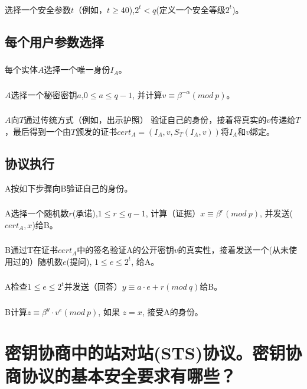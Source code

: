 \documentclass[11pt,a4paper]{article}
\begin{document}
\subsubsection{}选择一个安全参数$t$（例如，$t \ge40$),$2^t < q$(定义一个安全等级$2^t$)。

\subsection{每个用户参数选择}
\subsubsection{}每个实体$A$选择一个唯一身份$I_A$。
\subsubsection{}$A$选择一个秘密密钥$a$,$0 \le a \le q-1$, 并计算$v \equiv \beta^{-\alpha} (mod\ p)$。
\subsubsection{}$A$向$T$通过传统方式（例如，出示护照） 验证自己的身份，接着将真实的$v$传递给$T$，最后得到一个由$T$颁发的证书$cert_A=(I_A,v,S_T(I_A,v))$将$I_A$和$v$绑定。

\subsection{协议执行} A按如下步骤向B验证自己的身份。
\subsubsection{}A选择一个随机数$r$(承诺),$1\le r \le q-1$, 计算（证据）$x\equiv \beta^r(mod\ p)$, 并发送($cert_A, x$)给B。
\subsubsection{}B通过T在证书$cert_A$中的签名验证A的公开密钥$v$的真实性，接着发送一个(从未使用过的）随机数$e$(提问), $1 \le e \le 2^t$, 给A。
\subsubsection{}A检查$1\le e \le2^t$并发送（回答）$y\equiv a·e+r(mod\ q)$给B。
\subsubsection{}B计算$z\equiv \beta^y·v^e(mod\ p)$, 如果 $z=x$, 接受A的身份。
\section{密钥协商中的站对站(STS)协议。密钥协商协议的基本安全要求有哪些？}
\end{document}
